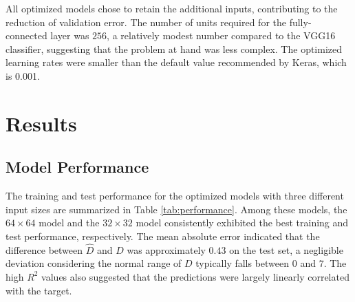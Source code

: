 \documentclass[]{interact}
\theoremstyle{plain}%
\theoremstyle{definition}
\theoremstyle{remark}
\begin{document}
All optimized models chose to retain the additional inputs, contributing
to the reduction of validation error. The number of units required for
the fully-connected layer was \(256\), a relatively modest number
compared to the VGG16 classifier, suggesting that the problem at hand
was less complex. The optimized learning rates were smaller than the
default value recommended by Keras, which is 0.001.

\begin{table}

\caption{\label{tab:best-hyperparameter}Hyperparameters values for the optimized computer vision models with different input sizes.}
\centering
{}
\end{table}

\section{Results}\label{results}

\subsection{Model Performance}\label{model-performance}

The training and test performance for the optimized models with three
different input sizes are summarized in Table \ref{tab:performance}.
Among these models, the \(64 \times 64\) model and the \(32 \times 32\)
model consistently exhibited the best training and test performance,
respectively. The mean absolute error indicated that the difference
between \(\hat{D}\) and \(D\) was approximately \(0.43\) on the test
set, a negligible deviation considering the normal range of \(D\)
typically falls between \(0\) and \(7\). The high \(R^2\) values also
suggested that the predictions were largely linearly correlated with the
target.
\end{document}
